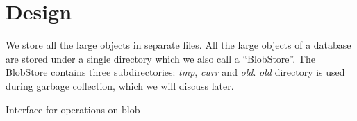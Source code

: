 \chapter{Design}
\label{chap:design}

We store all the large objects in separate files. All the large objects of a database are stored under a single directory which we also call a ``BlobStore''.
The BlobStore contains three subdirectories: \textit{tmp}, \textit{curr} and \textit{old}. \textit{old} directory is used during garbage collection, which we will discuss later.

\begin{table}
\caption{Interface for operations on blob}
\label{tab:interface-blob}
\end{table}
